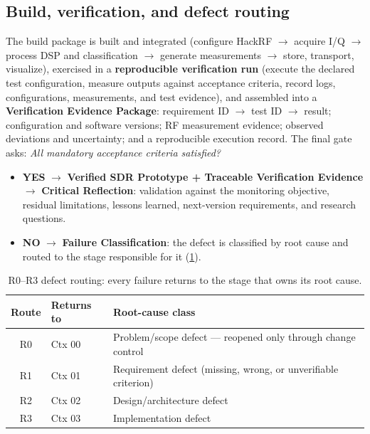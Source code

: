 \documentclass[11pt,a4paper]{article}
\begin{document}
\subsection{Build, verification, and defect routing}
\label{sec:routing}

The build package is built and integrated (configure HackRF $\rightarrow$ acquire I/Q $\rightarrow$
process DSP and classification $\rightarrow$ generate measurements $\rightarrow$ store, transport,
visualize), exercised in a \textbf{reproducible verification run} (execute the declared test
configuration, measure outputs against acceptance criteria, record logs, configurations,
measurements, and test evidence), and assembled into a \textbf{Verification Evidence Package}:
requirement ID $\rightarrow$ test ID $\rightarrow$ result; configuration and software versions;
RF measurement evidence; observed deviations and uncertainty; and a reproducible execution
record. The final gate asks: \emph{All mandatory acceptance criteria satisfied?}

\begin{itemize}
  \item \textbf{YES} $\rightarrow$ \textbf{Verified SDR Prototype + Traceable Verification
    Evidence} $\rightarrow$ \textbf{Critical Reflection}: validation against the monitoring
    objective, residual limitations, lessons learned, next-version requirements, and research
    questions.
  \item \textbf{NO} $\rightarrow$ \textbf{Failure Classification}: the defect is classified by
    root cause and routed to the stage responsible for it (\cref{tab:routing}).
\end{itemize}

\begin{table}[htbp]
\centering
\caption{R0--R3 defect routing: every failure returns to the stage that owns its root cause.}
\label{tab:routing}
\small
\begin{tabular}{@{}clp{7.4cm}@{}}
\toprule
\textbf{Route} & \textbf{Returns to} & \textbf{Root-cause class} \\
\midrule
R0 & Ctx 00 & Problem/scope defect --- reopened only through change control \\
R1 & Ctx 01 & Requirement defect (missing, wrong, or unverifiable criterion) \\
R2 & Ctx 02 & Design/architecture defect \\
R3 & Ctx 03 & Implementation defect \\
\bottomrule
\end{tabular}
\end{table}
\end{document}
